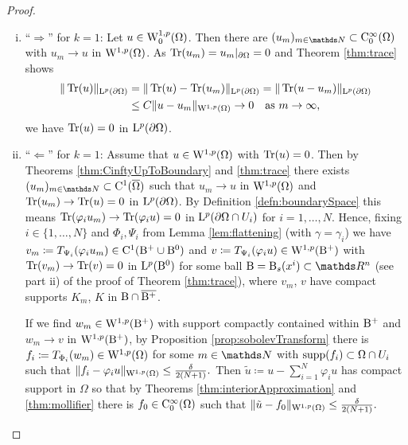 \begin{proof}
  \begin{enumerate}[i)]
    \item ``$\Rightarrow$'' for $k = 1$:
      Let $u \in \mathrm{W}_0^{1,p}(\Omega)$.
      Then there are $(u_m)_{m \in \N} \subset \CC_0^\infty(\Omega)$ with $u_m \to u$ in $\mathrm{W}^{1,p}(\Omega)$.
      As $\operatorname{Tr}(u_m) = u_m|_{\partial\Omega} = 0$ and Theorem \ref{thm:trace} shows
      \begin{align*}
        \| \operatorname{Tr}(u) \|_{\mathrm{L}^p(\partial\Omega)}
        &= \|\operatorname{Tr}(u) - \operatorname{Tr}(u_m)\|_{\mathrm{L}^p(\partial\Omega)}
        = \| \operatorname{Tr}(u - u_m) \|_{\mathrm{L}^p(\partial\Omega)} \\
        &\leq C \|u - u_m\|_{\mathrm{W}^{1,p}(\Omega)} \to 0 \quad \text{as } m \to \infty,
      \end{align*}
      we have $\operatorname{Tr}(u) = 0$ in $\mathrm{L}^p(\partial\Omega)$.

    \item ``$\Leftarrow$'' for $k = 1$:
    Assume that $u \in \mathrm{W}^{1,p}(\Omega)$ with $\operatorname{Tr}(u) = 0$.
    Then by Theorems \ref{thm:CinftyUpToBoundary} and \ref{thm:trace} there exists $(u_m)_{m \in \N} \subset \CC^1(\overline\Omega)$ such that $u_m \to u$ in $\mathrm{W}^{1,p}(\Omega)$ and $\operatorname{Tr}(u_m) \to \operatorname{Tr}(u) = 0$ in $\mathrm{L}^p(\partial\Omega)$.
    By Definition \ref{defn:boundarySpace} this means $\operatorname{Tr}(\varphi_i u_m) \to \operatorname{Tr}(\varphi_i u) = 0$ in $\mathrm{L}^p(\partial\Omega \cap U_i)$ for $i = 1,\dots,N$.
    Hence, fixing $i \in \{1, \dots, N\}$ and $\Phi_i, \Psi_i$ from Lemma \ref{lem:flattening} (with $\gamma = \gamma_i$) we have $v_m \coloneqq T_{\Psi_i}(\varphi_i u_m) \in \mathrm{C}^1(\mathrm{B}^+ \cup \mathrm{B}^0)$ and $v \coloneqq T_{\Psi_i}(\varphi_i u) \in \mathrm{W}^{1,p}(\mathrm{B}^+)$ with $\operatorname{Tr}(v_m) \to \operatorname{Tr}(v) = 0$ in $\mathrm{L}^p(\mathrm{B}^0)$ for some ball $\BB = \BB_s(x^i) \subset \R^n$ (see part ii) of the proof of Theorem \ref{thm:trace}), where $v_m$, $v$ have compact supports $K_m$, $K$ in $\mathrm{B} \cap \overline{\mathrm{B}^+}$.

    If we find $w_m \in \mathrm{W}^{1,p}(\mathrm{B}^+)$ with support compactly contained within $\mathrm{B}^+$ and $w_m \to v$ in $\mathrm{W}^{1,p}(\mathrm{B}^+)$, by Proposition \ref{prop:sobolevTransform} there is $f_i \coloneqq T_{\Phi_i}(w_m) \in \mathrm{W}^{1,p}(\Omega)$ for some $m \in \N$ with $\operatorname{supp}(f_i) \subset \Omega \cap U_i$ such that 
    $\|f_i - \varphi_i u\|_{\mathrm{W}^{1,p}(\Omega)} \leq \frac{\delta}{2(N + 1)}.$
    Then $\tilde u \coloneqq u - \sum_{i = 1}^N \varphi_i u$ has compact support in $\Omega$ so that by Theorems \ref{thm:interiorApproximation} and \ref{thm:mollifier} there is $f_0 \in \mathrm{C}_0^\infty(\Omega)$ such that 
    $\| \tilde u - f_0 \|_{\mathrm{W}^{1,p}(\Omega)} \leq \frac{\delta}{2(N + 1)}.$


\end{enumerate}
\end{proof}
